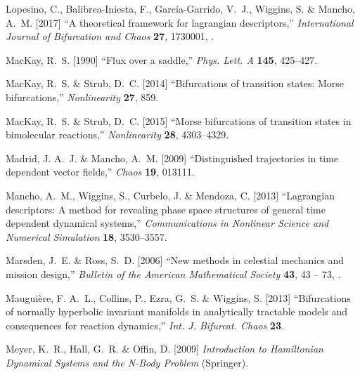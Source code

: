 \documentclass{ws-ijbc}
\begin{document}
\begin{thebibliography}{76}
	Lopesino, C., Balibrea-Iniesta, F., Garc\'ia-Garrido, V.~J., Wiggins, S. \&
	Mancho, A.~M. [2017] \enquote{A theoretical framework for lagrangian
		descriptors,} \emph{International Journal of Bifurcation and Chaos}
	\textbf{27},  1730001, .
	
	MacKay, R.~S. [1990] \enquote{{Flux over a saddle},} \emph{Phys. Lett. A}
	\textbf{145},  425--427.
	
	MacKay, R.~S. \& Strub, D.~C. [2014] \enquote{Bifurcations of transition
		states: Morse bifurcations,} \emph{Nonlinearity} \textbf{27},  859.
	
	{MacKay}, R.~S. \& {Strub}, D.~C. [2015] \enquote{{Morse bifurcations of
			transition states in bimolecular reactions},} \emph{Nonlinearity}
	\textbf{28},  4303--4329.
	
	Madrid, J. A.~J. \& Mancho, A.~M. [2009] \enquote{{Distinguished trajectories
			in time dependent vector fields},} \emph{Chaos} \textbf{19},  013111.
	
	Mancho, A.~M., Wiggins, S., Curbelo, J. \& Mendoza, C. [2013]
	\enquote{Lagrangian descriptors: A method for revealing phase space
		structures of general time dependent dynamical systems,} \emph{Communications
		in Nonlinear Science and Numerical Simulation} \textbf{18},  3530--3557.
	
	Marsden, J.~E. \& Ross, S.~D. [2006] \enquote{New methods in celestial
		mechanics and mission design,} \emph{Bulletin of the American Mathematical
		Society} \textbf{43},  43 -- 73,
	.
	
	Maugui{\`e}re, F. A.~L., Collins, P., Ezra, G.~S. \& Wiggins, S. [2013]
	\enquote{Bifurcations of normally hyperbolic invariant manifolds in
		analytically tractable models and consequences for reaction dynamics,}
	\emph{Int. J. Bifurcat. Chaos} \textbf{23}.
	
	Meyer, K.~R., Hall, G.~R. \& Offin, D. [2009] \emph{{Introduction to
			Hamiltonian Dynamical Systems and the N-Body Problem}} (Springer).
	

\end{thebibliography}
\end{document}

